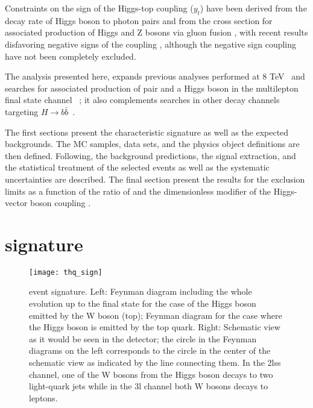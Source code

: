 Constraints on the sign of the Higgs-top coupling ($y_t$) have been derived from the decay rate of Higgs boson to photon pairs \cite{biswas} and from the cross section for associated production of Higgs and Z bosons via gluon fusion \cite{hespel}, with recent results disfavoring negative signs of the coupling \cite{cms_ht_couplings,comb_ht_couplings,diboson}, although the negative sign coupling have not been completely excluded.

The analysis presented here, expands previous analyses performed at 8 TeV~\cite{Khachatryan_2015,CMS_AN_2014-140} and searches for associated production of \ttbar pair and a Higgs boson in the multilepton final state channel ~\cite{CMS_AN_2016-211}; it also complements searches in other decay channels targeting $H\to b\bar{b}$~\cite{CMS_PAS_HIG_16-019}.

The first sections present the characteristic \tHq signature as well as the expected backgrounds. The MC samples, data sets, and the physics object definitions are then defined. Following, the background predictions, the signal extraction, and the statistical treatment of the selected events as well as the systematic uncertainties are described. The final section present the results for the exclusion limits as a function of the ratio of \Ct and the dimensionless modifier of the Higgs-vector boson coupling \CV.  


\section{\tHq signature}\label{sec:thw_sign}

\begin{figure}[!h]
\begin{center}
\texttt{[image: thq\_sign]}
\end{center}
\caption[\tHq event signature]{\tHq event signature. Left: Feynman diagram including the whole evolution up to the final state for the case of the Higgs boson emitted by the W boson (top); Feynman diagram for the case where the Higgs boson is emitted by the top quark. Right: Schematic view as it would be seen in the detector; the circle in the Feynman diagrams on the left corresponds to the circle in the center of the schematic view as indicated by the line connecting them. In the 2lss channel, one of the W bosons from the Higgs boson decays to two light-quark jets while in the 3l channel both W bosons decays to leptons.}
\label{fig:thq_sign}
\end{figure}

